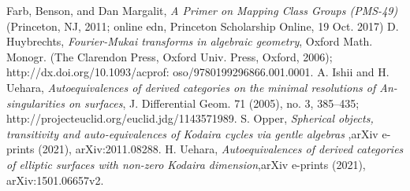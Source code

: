 \documentclass[uplatex,a4paper,11pt,dvipdfmx]{jsarticle}
\theoremstyle{mystyle} %
\begin{document}
\begin{thebibliography}{99}
	 Farb, Benson, and Dan Margalit, \textit{A Primer on Mapping Class Groups (PMS-49)} (Princeton, NJ, 2011; online edn, Princeton Scholarship Online, 19 Oct. 2017)
	 D. Huybrechts, \textit{Fourier-Mukai transforms in algebraic geometry}, Oxford Math. Monogr. (The
	Clarendon Press, Oxford Univ. Press, Oxford, 2006); http://dx.doi.org/10.1093/acprof:
	oso/9780199296866.001.0001.
	 A. Ishii and H. Uehara, \textit{Autoequivalences of derived categories on the minimal resolutions of An-singularities on surfaces}, J. Differential Geom. 71 (2005), no. 3, 385–435; http://projecteuclid.org/euclid.jdg/1143571989.
	 S. Opper, \textit{Spherical objects, transitivity and auto-equivalences of Kodaira cycles via gentle algebras
	},arXiv e-prints (2021), arXiv:2011.08288.
	 H. Uehara, \textit{Autoequivalences of derived categories of elliptic surfaces with non-zero Kodaira dimension},arXiv e-prints (2021), arXiv:1501.06657v2.
\end{thebibliography}
\end{document}
